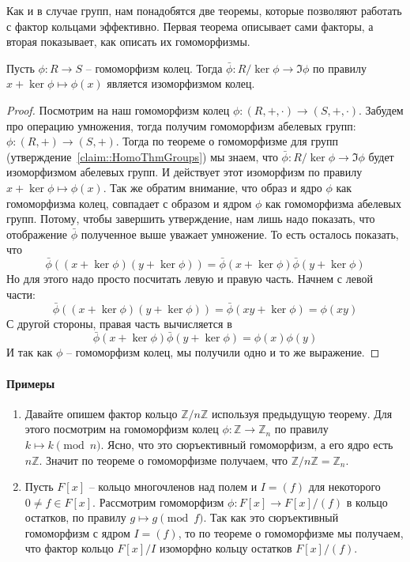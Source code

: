 Как и в случае групп, нам понадобятся две теоремы, которые позволяют работать с фактор кольцами эффективно.
Первая теорема описывает сами факторы, а вторая показывает, как описать их гомоморфизмы.

\begin{claim}
Пусть $\phi\colon R\to S$ -- гомоморфизм колец.
Тогда $\bar \phi \colon R/\ker \phi \to \Im \phi$ по правилу $x + \ker \phi \mapsto \phi(x)$ является изоморфизмом колец.
\end{claim}
\begin{proof}
Посмотрим на наш гомоморфизм колец $\phi\colon (R, +, \cdot) \to (S, +, \cdot)$.
Забудем про операцию умножения, тогда получим гомоморфизм абелевых групп: $\phi \colon (R, +) \to (S, +)$.
Тогда по теореме о гомоморфизме для групп (утверждение~\ref{claim::HomoThmGroups}) мы знаем, что $\bar \phi \colon R/\ker \phi \to \Im\phi$ будет изоморфизмом абелевых групп.
И действует этот изоморфизм по правилу $x + \ker \phi \mapsto \phi(x)$.
Так же обратим внимание, что образ и ядро $\phi$ как гомоморфизма колец, совпадает с образом и ядром $\phi$ как гомоморфизма абелевых групп.
Потому, чтобы завершить утверждение, нам лишь надо показать, что отображение $\bar\phi$ полученное выше уважает умножение.
То есть осталось показать, что
\[
\bar\phi((x + \ker \phi) (y + \ker \phi)) = \bar \phi(x + \ker \phi) \bar \phi (y + \ker \phi)
\]
Но для этого надо просто посчитать левую и правую часть.
Начнем с левой части:
\[
\bar\phi((x + \ker \phi) (y + \ker \phi)) = \bar\phi(xy + \ker \phi) = \phi(xy)
\]
С другой стороны, правая часть вычисляется в
\[
 \bar \phi(x + \ker \phi) \bar \phi (y + \ker \phi) = \phi(x) \phi(y)
\]
И так как $\phi$ -- гомоморфизм колец, мы получили одно и то же выражение.
\end{proof}

\paragraph{Примеры}

\begin{enumerate}
\item Давайте опишем фактор кольцо $\mathbb Z / n \mathbb Z$ используя предыдущую теорему.
Для этого посмотрим на гомоморфизм колец $\phi \colon \mathbb Z\to \mathbb Z_n$ по правилу $k \mapsto k \pmod n$.
Ясно, что это сюръективный гомоморфизм, а его ядро есть $n \mathbb Z$.
Значит по теореме о гомоморфизме получаем, что $\mathbb Z/ n \mathbb Z = \mathbb Z_n$.

\item Пусть $F[x]$ -- кольцо многочленов над полем и $I = (f)$ для некоторого $0\neq f \in F[x]$.
Рассмотрим гомоморфизм $\phi\colon F[x]\to F[x]/(f)$ в кольцо остатков, по правилу $g \mapsto g \pmod f$.
Так как это сюръективный гомоморфизм с ядром $I = (f)$, то по теореме о гомоморфизме мы получаем, что фактор кольцо $F[x] / I$ изоморфно кольцу остатков $F[x]/(f)$.
\end{enumerate}

